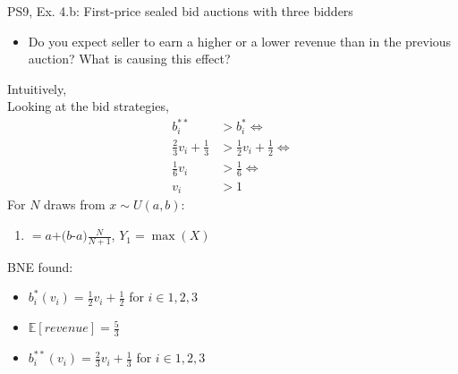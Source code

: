 \begin{frame}{PS9, Ex. 4.b: First-price sealed bid auctions with three bidders}
    \begin{itemize}
      \item[(b)] Do you expect seller to earn a higher or a lower revenue than in the previous auction? What is causing this effect?
    \end{itemize}
    \vspace{-8pt}
    \begin{multicols}{2}
    Intuitively, \\\medskip
    Looking at the bid strategies, 
    \begin{align*}
      b_i^{**}&>b_i^{*}\Leftrightarrow\\
      \frac{2}{3}v_i+\frac{1}{3}&>\frac{1}{2}v_i+\frac{1}{2}\Leftrightarrow\\
      \frac{1}{6}v_i&>\frac{1}{6}\Leftrightarrow\\
                 v_i&>1
    \end{align*}
    \vfill\null\columnbreak
    For $N$ draws from $x\sim U(a, b):$
    \vspace{-6pt}
    \begin{enumerate}
      \item[$\mathbb{E}(Y_1)$] $=a$+$(b$-$a)\frac{N}{N+1}$, $Y_1=\max(X)$
    \end{enumerate}
    \vspace{-6pt}
    BNE found:
    \begin{itemize}
      \item[(3.a)] $b_i^{*}(v_i)=\frac{1}{2}v_i+\frac{1}{2}$ for $i\in1,2,3$
      \item[(3.b)] $\mathbb{E}[revenue]=\frac{5}{3}$
      \item[(4.a)] $b_i^{**}(v_i)=\frac{2}{3}v_i+\frac{1}{3}$ for $i\in1,2,3$
    \end{itemize}
    \vfill\null
    \end{multicols}
\end{frame}
